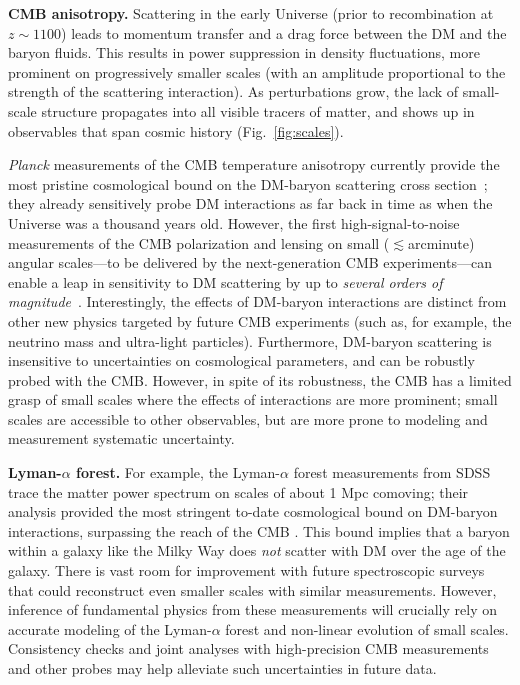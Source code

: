 \documentclass[12pt]{article}
\begin{document}
\textbf{CMB anisotropy.} 
Scattering in the early Universe (prior to recombination at $z\sim 1100$) leads to momentum transfer and a drag force between the DM and the baryon fluids.
This results in power suppression in density fluctuations, more prominent on progressively smaller scales (with an amplitude proportional to the strength of the scattering interaction).
As perturbations grow, the lack of small-scale structure propagates into all visible tracers of matter, and shows up in observables that span cosmic history (Fig.~\ref{fig:scales}).

\textit{Planck} measurements of the CMB temperature anisotropy currently provide the most pristine cosmological bound on the DM-baryon scattering cross section~\cite{Boddy:2018kfv,Gluscevic:2017ywp,Boddy:2018wzy,Xu:2018efh,Slatyer:2018aqg,Dvorkin:2013cea}; they already sensitively probe DM interactions as far back in time as when the Universe was a thousand years old.
However, the first high-signal-to-noise measurements of the CMB polarization and lensing on small ($\lesssim$arcminute) angular scales---to be delivered by the next-generation CMB experiments---can enable a leap in sensitivity to DM scattering by up to \textit{several orders of magnitude}~\cite{Li:2018zdm,2018arXiv180807445T,Abazajian:2016yjj,2019arXiv190210541H}.
Interestingly, the effects of DM-baryon interactions are distinct from other new physics targeted by future CMB experiments (such as, for example, the neutrino mass and ultra-light particles).
Furthermore, DM-baryon scattering is insensitive to uncertainties on cosmological parameters, and can be robustly probed with the CMB.
However, in spite of its robustness, the CMB has a limited grasp of small scales where the effects of interactions are more prominent; small scales are accessible to other observables, but are more prone to modeling and measurement systematic uncertainty.

\textbf{Lyman-$\alpha$ forest.} 
For example, the Lyman-$\alpha$ forest measurements from SDSS trace the matter power spectrum on scales of about 1 Mpc comoving; their analysis provided the most stringent to-date cosmological bound on DM-baryon interactions, surpassing the reach of the CMB  \cite{Xu:2018efh,Dvorkin:2013cga}.
This bound implies that a baryon within a galaxy like the Milky Way does \textit{not} scatter with DM over the age of the galaxy.
There is vast room for improvement with future spectroscopic surveys that could reconstruct even smaller scales with similar measurements.
However, inference of fundamental physics from these measurements will crucially rely on accurate modeling of the Lyman-$\alpha$ forest and non-linear evolution of small scales.
Consistency checks and joint analyses with high-precision CMB measurements and other probes may help alleviate such uncertainties in future data.
\end{document}

